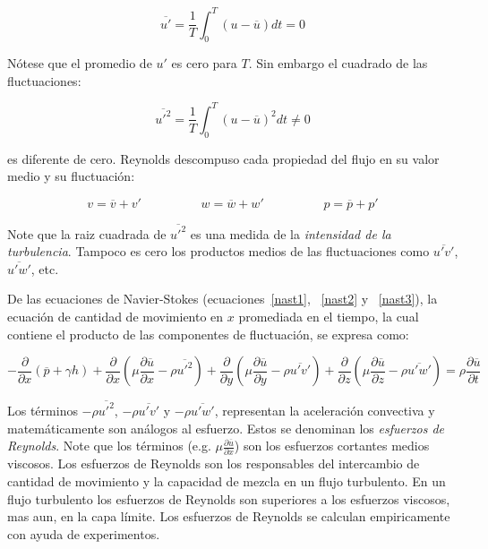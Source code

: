 \documentclass[11pt, oneside]{article}
\begin{document}
\begin{equation}
\overline{u'} = \frac{1}{T} \int_0^T (u-\overline{u}) dt = 0
\label{tur3}
\end{equation}

N\'otese que el promedio de $u'$ es cero para $T$. Sin embargo el cuadrado de las fluctuaciones:

\begin{equation}
\overline{{u'}^2} = \frac{1}{T} \int_0^T (u-\overline{u})^2 dt \neq 0
\label{tur4}
\end{equation}
 
es diferente de cero. Reynolds descompuso cada propiedad del flujo en su valor medio y su fluctuaci\'on:

\begin{equation}
v = \overline{v} + v' \hspace{2cm} w = \overline{w} + w' \hspace{2cm} p = \overline{p} + p'
\label{tur44}
\end{equation}

Note que la raiz cuadrada de $\overline{{u'}^2}$  es una medida de la \emph{intensidad de la turbulencia}. Tampoco es cero los productos medios de las fluctuaciones como $\overline{u' v'}$, $\overline{u' w'}$, etc.

De las ecuaciones de Navier-Stokes (ecuaciones~\ref{nast1}, ~\ref{nast2} y ~\ref{nast3}), la ecuaci\'on de cantidad de movimiento en $x$ promediada en el tiempo, la cual contiene el producto de las componentes de fluctuaci\'on, se expresa como:

\begin{equation}
-\frac{\partial}{\partial x}(\overline{p} + \gamma h) + \frac{\partial}{\partial x}\left( \mu \frac{\partial \overline{u}}{\partial x} - \rho \overline{{u'}^2} \right) + \frac{\partial}{\partial y}\left( \mu \frac{\partial \overline{u}}{\partial y} - \rho \overline{u' v'} \right) + \frac{\partial}{\partial z}\left( \mu \frac{\partial \overline{u}}{\partial z} - \rho \overline{u' w'} \right) = \rho \frac{\partial \overline{u}}{\partial t}
\label{tur5}
\end{equation}

Los t\'erminos $-\rho \overline{{u'}^2}$, $-\rho \overline{u' v'}$ y $-\rho \overline{u' w'}$, representan la aceleraci\'on convectiva y matem\'aticamente son an\'alogos al esfuerzo. Estos se denominan los \emph{esfuerzos de Reynolds}. Note que los t\'erminos (e.g. $\mu\frac{\partial \overline{u}}{\partial x}$) son los esfuerzos cortantes medios viscosos. Los esfuerzos de Reynolds son los responsables del intercambio de cantidad de movimiento y la capacidad de mezcla en un flujo turbulento. En un flujo turbulento los esfuerzos de Reynolds son superiores a los esfuerzos viscosos, mas aun, en la capa l\'imite. Los esfuerzos de Reynolds se calculan empiricamente con ayuda de experimentos. 
\end{document}

